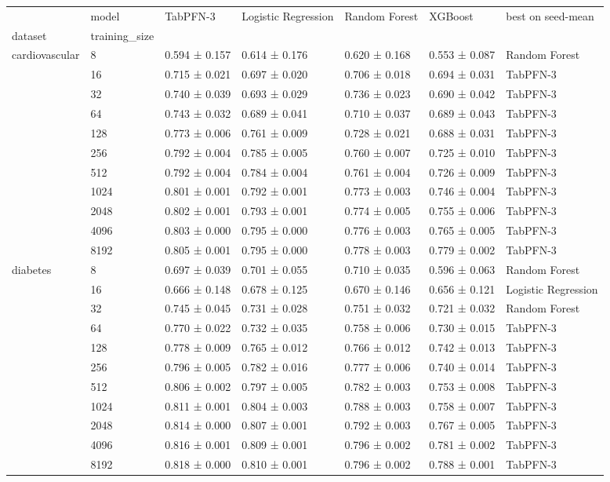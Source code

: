 \begin{tabular}{lllllll}
\toprule
 & model & TabPFN-3 & Logistic Regression & Random Forest & XGBoost & best on seed-mean \\
dataset & training_size &  &  &  &  &  \\
\midrule
\multirow[t]{11}{*}{cardiovascular} & 8 & 0.594 ± 0.157 & 0.614 ± 0.176 & 0.620 ± 0.168 & 0.553 ± 0.087 & Random Forest \\
 & 16 & 0.715 ± 0.021 & 0.697 ± 0.020 & 0.706 ± 0.018 & 0.694 ± 0.031 & TabPFN-3 \\
 & 32 & 0.740 ± 0.039 & 0.693 ± 0.029 & 0.736 ± 0.023 & 0.690 ± 0.042 & TabPFN-3 \\
 & 64 & 0.743 ± 0.032 & 0.689 ± 0.041 & 0.710 ± 0.037 & 0.689 ± 0.043 & TabPFN-3 \\
 & 128 & 0.773 ± 0.006 & 0.761 ± 0.009 & 0.728 ± 0.021 & 0.688 ± 0.031 & TabPFN-3 \\
 & 256 & 0.792 ± 0.004 & 0.785 ± 0.005 & 0.760 ± 0.007 & 0.725 ± 0.010 & TabPFN-3 \\
 & 512 & 0.792 ± 0.004 & 0.784 ± 0.004 & 0.761 ± 0.004 & 0.726 ± 0.009 & TabPFN-3 \\
 & 1024 & 0.801 ± 0.001 & 0.792 ± 0.001 & 0.773 ± 0.003 & 0.746 ± 0.004 & TabPFN-3 \\
 & 2048 & 0.802 ± 0.001 & 0.793 ± 0.001 & 0.774 ± 0.005 & 0.755 ± 0.006 & TabPFN-3 \\
 & 4096 & 0.803 ± 0.000 & 0.795 ± 0.000 & 0.776 ± 0.003 & 0.765 ± 0.005 & TabPFN-3 \\
 & 8192 & 0.805 ± 0.001 & 0.795 ± 0.000 & 0.778 ± 0.003 & 0.779 ± 0.002 & TabPFN-3 \\
\cline{1-7}
\multirow[t]{11}{*}{diabetes} & 8 & 0.697 ± 0.039 & 0.701 ± 0.055 & 0.710 ± 0.035 & 0.596 ± 0.063 & Random Forest \\
 & 16 & 0.666 ± 0.148 & 0.678 ± 0.125 & 0.670 ± 0.146 & 0.656 ± 0.121 & Logistic Regression \\
 & 32 & 0.745 ± 0.045 & 0.731 ± 0.028 & 0.751 ± 0.032 & 0.721 ± 0.032 & Random Forest \\
 & 64 & 0.770 ± 0.022 & 0.732 ± 0.035 & 0.758 ± 0.006 & 0.730 ± 0.015 & TabPFN-3 \\
 & 128 & 0.778 ± 0.009 & 0.765 ± 0.012 & 0.766 ± 0.012 & 0.742 ± 0.013 & TabPFN-3 \\
 & 256 & 0.796 ± 0.005 & 0.782 ± 0.016 & 0.777 ± 0.006 & 0.740 ± 0.014 & TabPFN-3 \\
 & 512 & 0.806 ± 0.002 & 0.797 ± 0.005 & 0.782 ± 0.003 & 0.753 ± 0.008 & TabPFN-3 \\
 & 1024 & 0.811 ± 0.001 & 0.804 ± 0.003 & 0.788 ± 0.003 & 0.758 ± 0.007 & TabPFN-3 \\
 & 2048 & 0.814 ± 0.000 & 0.807 ± 0.001 & 0.792 ± 0.003 & 0.767 ± 0.005 & TabPFN-3 \\
 & 4096 & 0.816 ± 0.001 & 0.809 ± 0.001 & 0.796 ± 0.002 & 0.781 ± 0.002 & TabPFN-3 \\
 & 8192 & 0.818 ± 0.000 & 0.810 ± 0.001 & 0.796 ± 0.002 & 0.788 ± 0.001 & TabPFN-3 \\
\cline{1-7}
\bottomrule
\end{tabular}
